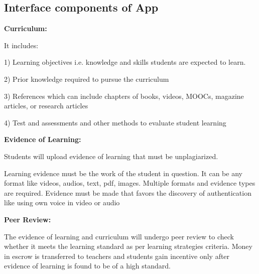\documentclass[a4paper,12pt,twoside]{extarticle}
\begin{document}
\begin{adjustwidth}{11em}{}
\section*{Interface components of App}


\textbf{Curriculum:}

It includes:

1) Learning objectives i.e. knowledge and skills students are expected to learn.

2) Prior knowledge required to pursue the curriculum

3) References which can include chapters of books, videos, MOOCs, magazine articles, or research articles

4) Test and assessments and other methods to evaluate student learning

\textbf{Evidence of Learning:}

Students will upload evidence of learning that must be unplagiarized.

Learning evidence must be the work of the student in question. It can be any format like videos, audios, text, pdf, images. Multiple formats and evidence types are required. Evidence must be made that favors the discovery of authentication like using own voice in video or audio

\textbf{Peer Review:}

The evidence of learning and curriculum will undergo peer review to check whether it meets the learning standard as per learning strategies criteria. Money in escrow is transferred to teachers and students gain incentive only after evidence of learning is found to be of a high standard. 




\end{adjustwidth}
\end{document}
